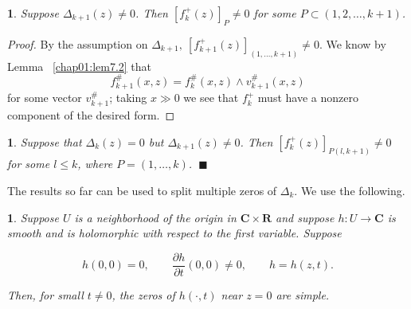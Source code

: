 \documentclass{surv-l}
\theoremstyle{plain}
\newtheorem{cor}[theorem]{\sc{Corollary}}
\newtheorem{prop}[theorem]{\sc{Proposition}}
\newtheorem{lemma}[theorem]{\sc{Lemma}}
\theoremstyle{definition}
\numberwithin{equation}{chapter}
\begin{document}
\setcounter{theorem}{8}
\begin{lemma}\label{lem19.9}
Suppose $\Delta_{k+1}(z)\neq 0$.  Then $[f_{k}^{+}(z)]_{P}\neq 0$  for some $ P\subset (1, 2,\ldots, k+1)$.
\end{lemma}
\begin{proof}
By the assumption on $\Delta_{k+1},\ [f_{k+1}^{+}(z)]_{(1,\ldots,k+1)}\neq 0$. We know by Lemma ~\ref{chap01:lem7.2} that
\begin{equation*}
f_{k+1}^{\#}(x,z)=f_{k}^{\#}(x,z) \wedge v_{k+1}^{\#}(x, z)
\end{equation*}
for some vector $v_{k+1}^{\#}$; taking $x\gg 0$ we see that $f_{k}^{+}$ must have a nonzero component of the desired form.
\end{proof}
\begin{cor}\label{coro19.10}
Suppose that $\Delta_{k}(z)=0$ but $\Delta_{k+1}(z)\neq 0$.   Then $[f_{k}^{+}(z)]_{P(l,k+1)}\neq 0$ for some $l\leq k$, where $P=(1,\ldots,k)$. $\ \blacksquare$
\end{cor}
The results so far can be used to split multiple zeros of $\Delta_{k}$.  We use the following.
\begin{prop}\label{prop19.11}
Suppose $U$  is a neighborhood of the origin in $\mathbf{C}\times{\mathbf{R}}$ and suppose $h:U\rightarrow \mathbf{C}$ is smooth and is holomorphic with respect to the first variable. Suppose

\begin{equation*}
h(0,0)=0,\qquad \frac{\partial h}{\partial t}(0,0)\neq 0,\qquad h=h(z,t).
\end{equation*}

Then, for small $t\neq 0$, the zeros of $h(\cdot,t)$ near $z=0$ are simple.
\end{prop}
\end{document}
